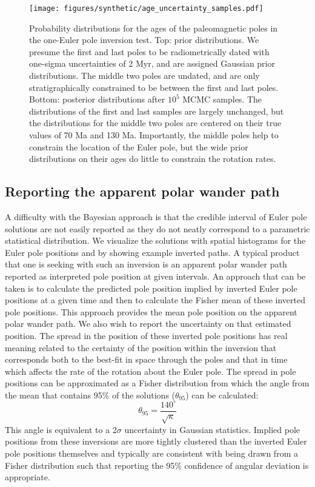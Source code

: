 \documentclass[11pt,letterpaper]{article}
\begin{document}
\begin{figure}
\texttt{[image: figures/synthetic/age\_uncertainty\_samples.pdf]}
\caption[Probability distributions for ages of the paleomagnetic poles in the one-Euler pole inversion test.]{Probability distributions for the ages of the paleomagnetic poles in the one-Euler pole inversion test. Top: prior distributions. We presume the first and last poles to be radiometrically dated with one-sigma uncertainties of 2 Myr, and are assigned Gaussian prior distributions. The middle two poles are undated, and are only stratigraphically constrained to be between the first and last poles. Bottom: posterior distributions after $10^5$ MCMC samples. The distributions of the first and last samples are largely unchanged, but the distributions for the middle two poles are centered on their true values of 70 Ma and 130 Ma. Importantly, the middle poles help to constrain the location of the Euler pole, but the wide prior distributions on their ages do little to constrain the rotation rates.}
\label{fig:age_uncertainty_samples}
\end{figure}

\subsection*{Reporting the apparent polar wander path}
\label{sec:age_uncertainty}
A difficulty with the Bayesian approach is that the credible interval of Euler pole solutions are not easily reported as they do not neatly correspond to a parametric statistical distribution.  We visualize the solutions with spatial histograms for the Euler pole positions and by showing example inverted paths. A typical product that one is seeking with such an inversion is an apparent polar wander path reported as interpreted pole position at given intervals. An approach that can be taken is to calculate the predicted pole position implied by inverted Euler pole positions at a given time and then to calculate the Fisher mean of these inverted pole positions.  This approach provides the mean pole position on the apparent polar wander path. We also wish to report the uncertainty on that estimated position. The spread in the position of these inverted pole positions has real meaning related to the certainty of the position within the inversion that corresponds both to the best-fit in space through the poles and that in time which affects the rate of the rotation about the Euler pole. The spread in pole positions can be approximated as a Fisher distribution from which the angle from the mean that contains 95$\%$ of the solutions ($\theta_{95}$) can be calculated:
\begin{equation}
\theta_{95}=\frac{140^{\circ}}{\sqrt{\kappa}}
\label{eq:angular_deviation}
\end{equation}
This angle is equivalent to a 2$\sigma$ uncertainty in Gaussian statistics. Implied pole positions from these inversions are more tightly clustered than the inverted Euler pole positions themselves and typically are consistent with being drawn from a Fisher distribution such that reporting the 95$\%$ confidence of angular deviation is appropriate.
\end{document}

